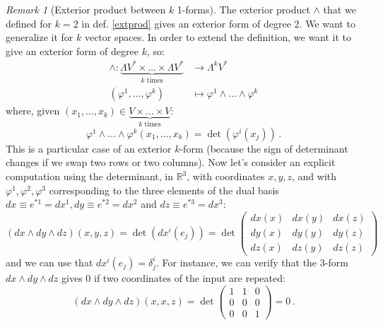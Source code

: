 \documentclass[a4paper,11pt,titlepage, article, oneside]{memoir}
\numberwithin{equation}{section}
\theoremstyle{definition}
\theoremstyle{remark}
\newtheorem{remark}[theorem]{Remark}
\newcommand{\rfield}{\mathbb{R}}
\begin{document}
\begin{remarkbox}\begin{remark}[Exterior product between $k$ 1-forms]
The exterior product $\wedge$ that we defined for $k=2$ in def. \ref{extprod} gives an exterior form of degree 2. We want to generalize it for $k$ vector spaces. In order to extend the definition, we want it to give an exterior form of degree $k$, so:
\begin{align*}
  \wedge \colon \underbrace{\Lambda V^* \times \ldots \times \Lambda V^*}_{k \text{ times}} &\rightarrow \Lambda^k V^*  \\
  (\varphi^1, \ldots, \varphi^k) &\mapsto \varphi^1 \wedge \ldots \wedge \varphi^k
\end{align*}
where, given $(x_1, \ldots, x_k) \in \underbrace{V \times \ldots \times V}_{k \text{ times}}$:
\begin{equation} \label{detformula}
  \varphi^1 \wedge \ldots \wedge \varphi^k (x_1, \ldots, x_k) =  \det\left (\varphi^i(x_j) \right) \, .
\end{equation}
This is a particular case of an exterior $k$-form (because the sign of determinant changes if we swap two rows or two columns).
Now let's consider an explicit computation using the determinant, in $\rfield^3$, with coordinates $x, y, z$, and with $\varphi^1, \varphi^2, \varphi^3$ corresponding to the three elements of the dual basis $dx \equiv e^{*1} = dx^1, dy \equiv e^{*2} = dx^2$ and $ dz \equiv e^{*3} = dx^3$:
\begin{equation*}
(dx \wedge dy \wedge dz)(x, y, z) = \det\left (dx^i(e_j) \right) = \det \left(
\begin{matrix}
dx(x) & dx(y) & dx(z) \\
dy(x) & dy(y) & dy(z) \\
dz(x) & dz(y) & dz(z)
\end{matrix}
\right )
\end{equation*}
and we can use that $dx^i(e_j) = \delta^i_j$. For instance, we can verify that the 3-form $dx \wedge dy \wedge dz$ gives 0 if two coordinates of the input are repeated:
\begin{equation*}
(dx \wedge dy \wedge dz)(x, x, z) = \det \left(
\begin{matrix}
1 & 1 & 0 \\
0 & 0 & 0 \\
0 & 0 & 1
\end{matrix}
\right ) = 0 \, .
\end{equation*}
\end{remark}\end{remarkbox}
\end{document}
